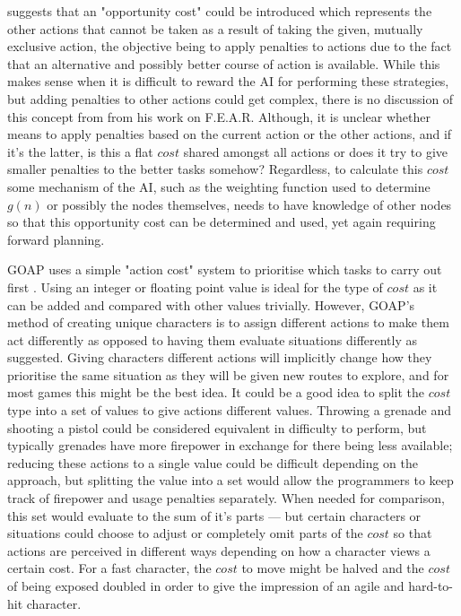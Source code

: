 \documentclass[11pt, a4paper]{article}
\begin{document}
\citeauthor{harmon2002economic} \parencite*[405]{harmon2002economic} suggests that an "opportunity cost" could be introduced which represents the other actions that cannot be taken as a result of taking the given, mutually exclusive action, the objective being to apply penalties to actions due to the fact that an alternative and possibly better course of action is available. While this makes sense when it is difficult to reward the AI for performing these strategies, but adding penalties to other actions could get complex, there is no discussion of this concept from \citeauthor{orkin2006three} \parencite*{orkin2006three} from his work on F.E.A.R. Although, it is unclear whether \citeauthor{harmon2002economic} means to apply penalties based on the current action or the other actions, and if it's the latter, is this a flat $cost$ shared amongst all actions or does it try to give smaller penalties to the better tasks somehow? Regardless, to calculate this $cost$ some mechanism of the AI, such as the weighting function used to determine $g(n)$ or possibly the nodes themselves, needs to have knowledge of other nodes so that this opportunity cost can be determined and used, yet again requiring forward planning.

GOAP uses a simple "action cost" system to prioritise which tasks to carry out first \parencite[11]{orkin2006three}. Using an integer or floating point value is ideal for the type of $cost$ as it can be added and compared with other values trivially. However, GOAP's method of creating unique characters is to assign different actions to make them act differently \parencite[8]{orkin2006three} as opposed to having them evaluate situations differently as \citeauthor{millington2019ai} \parencite*{millington2019ai} suggested. Giving characters different actions will implicitly change how they prioritise the same situation as they will be given new routes to explore, and for most games this might be the best idea. It could be a good idea to split the $cost$ type into a set of values to give actions different values. Throwing a grenade and shooting a pistol could be considered equivalent in difficulty to perform, but typically grenades have more firepower in exchange for there being less available; reducing these actions to a single value could be difficult depending on the approach, but splitting the value into a set would allow the programmers to keep track of firepower and usage penalties separately. When needed for comparison, this set would evaluate to the sum of it's parts --- but certain characters or situations could choose to adjust or completely omit parts of the $cost$ so that actions are perceived in different ways depending on how a character views a certain cost. For a fast character, the $cost$ to move might be halved and the $cost$ of being exposed doubled in order to give the impression of an agile and hard-to-hit character.
\end{document}
